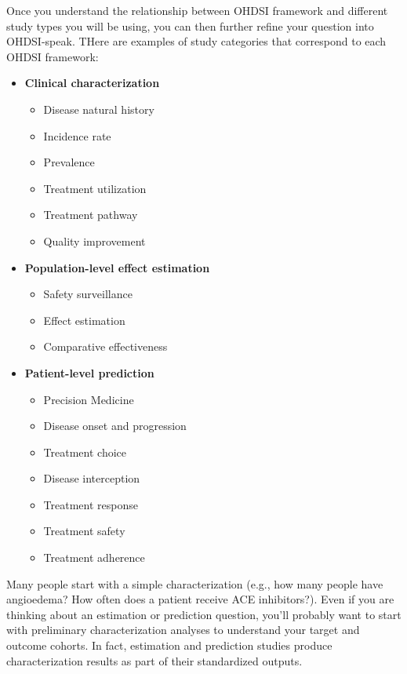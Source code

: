\documentclass[11pt]{book}
\providecommand{\tightlist}{%
  \setlength{\itemsep}{0pt}\setlength{\parskip}{0pt}}
\theoremstyle{definition}
\theoremstyle{definition}
\theoremstyle{definition}
\theoremstyle{remark}
\begin{document}
Once you understand the relationship between OHDSI framework and different study types you will be using, you can then further refine your question into OHDSI-speak. THere are examples of study categories that correspond to each OHDSI framework:

\begin{itemize}
\tightlist
\item
  \textbf{Clinical characterization}

  \begin{itemize}
  \tightlist
  \item
    Disease natural history
  \item
    Incidence rate
  \item
    Prevalence
  \item
    Treatment utilization
  \item
    Treatment pathway
  \item
    Quality improvement
  \end{itemize}
\item
  \textbf{Population-level effect estimation}

  \begin{itemize}
  \tightlist
  \item
    Safety surveillance
  \item
    Effect estimation
  \item
    Comparative effectiveness
  \end{itemize}
\item
  \textbf{Patient-level prediction}

  \begin{itemize}
  \tightlist
  \item
    Precision Medicine
  \item
    Disease onset and progression
  \item
    Treatment choice
  \item
    Disease interception
  \item
    Treatment response
  \item
    Treatment safety
  \item
    Treatment adherence
  \end{itemize}
\end{itemize}

Many people start with a simple characterization (e.g., how many people have angioedema? How often does a patient receive ACE inhibitors?). Even if you are thinking about an estimation or prediction question, you'll probably want to start with preliminary characterization analyses to understand your target and outcome cohorts. In fact, estimation and prediction studies produce characterization results as part of their standardized outputs.
\end{document}
